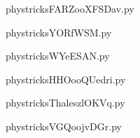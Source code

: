     \newcommand{\CaptionFigFARZooXFSDav}{<+Type your caption here+>}
    \begin{center}
        
    \end{center}
    phystricksFARZooXFSDav.py

    

    \clearpage
    


    \newcommand{\CaptionFigYORfWSM}{<+Type your caption here+>}
    \begin{center}
        
    \end{center}
    phystricksYORfWSM.py

    

    \clearpage
    


    \newcommand{\CaptionFigWYeESAN}{<+Type your caption here+>}
    \begin{center}
        
    \end{center}
    phystricksWYeESAN.py

    

    \clearpage
    


    \newcommand{\CaptionFigHHOooQUedri}{<+Type your caption here+>}
    \begin{center}
        
    \end{center}
    phystricksHHOooQUedri.py

    

    \clearpage
    


    \newcommand{\CaptionFigThaleszlOKVq}{<+Type your caption here+>}
    \begin{center}
        
    \end{center}
    phystricksThaleszlOKVq.py

    

    \clearpage
    


    \newcommand{\CaptionFigVGQoojvDGr}{<+Type your caption here+>}
    \begin{center}
        
    \end{center}
    phystricksVGQoojvDGr.py

